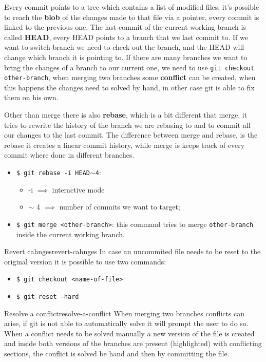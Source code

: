 \documentclass[12pt]{article}
\begin{document}
Every commit points to a tree which contains a list of modified files, it's possible to reach the \textbf{blob} of the changes made to that file via a pointer, every commit is linked to the previous one. The last commit of the current working branch is called \textbf{HEAD}, every HEAD points to a branch that we last commit to. If we want to switch branch we need to check out the branch, and the HEAD will change which branch it is pointing to. If there are many branches we want to bring the changes of a branch to our current one, we need to use \texttt{git checkout other-branch}, when merging two branches some \textbf{conflict} can be created, when this happens the changes need to solved by hand, in other case git is able to fix them on his own.

Other than merge there is also \textbf{rebase}, which is a bit different that merge, it tries to rewrite the history of the branch we are rebasing to and to commit all our changes to the last commit. The difference between merge and rebase, is the rebase it creates a linear commit history, while merge is keeps track of every commit where done in different branches.
\begin{itemize}
  \item \texttt{\$ git rebase -i HEAD$\sim$4}:
    \begin{itemize}
      \item -i $ \implies$ interactive mode
      \item $\sim$ 4 $ \implies$ number of commits we want to target;
    \end{itemize}
  \item \texttt{\$ git merge <other-branch>}: this command tries to merge \texttt{other-branch} inside the current working branch.
\end{itemize}
\begin{example}{Revert cahnges}{revert-cahnges}
  In case an uncommited file needs to be reset to the original version it is possible to use two commands:
  \begin{itemize}
    \item \texttt{\$ git checkout <name-of-file>}
    \item \texttt{\$ git reset --hard}
  \end{itemize}
\end{example}
\begin{example}{Resolve a conflict}{resolve-a-conflict}
  When merging two branches conflicts can arise, if git is not able to automatically solve it will prompt the user to do so. When a conflict needs to be solved manually a new version of the file is created and inside both versions of the branches are present (highlighted) with conflicting sections, the conflict is solved be hand and then by committing the file.
\end{example}
\end{document}
